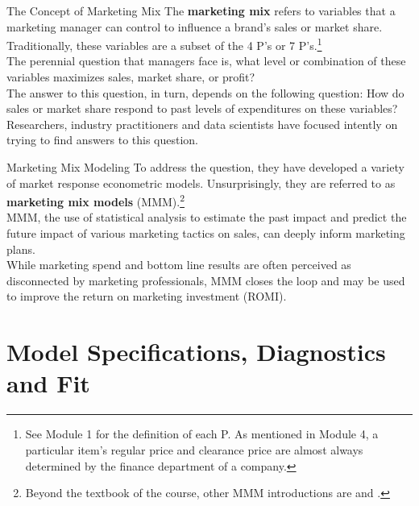 \documentclass[pdf]{beamer}
\newcommand{\empr}[1]{{\color{franklinblue}\textbf{#1}}}
\theoremstyle{remark}
\theoremstyle{definition}
\begin{document}
\begin{frame}[t]{The Concept of Marketing Mix}
The \empr{marketing mix} refers to variables that a marketing manager can control to influence a brand's sales or market share. Traditionally, these variables are a subset of the 4 P's or 7 P's.\footnote{See Module 1 for the definition of each P.  As mentioned in Module 4, a particular item's regular price and clearance price are almost always determined by the finance department of a company.} \\
\vspace{1.5ex}
The perennial question that managers face is, what level or combination of these variables maximizes sales, market share, or profit? \\
\vspace{1.5ex}
 The answer to this question, in turn, depends on the following question: How do sales or market share respond to past levels of  expenditures on these variables? Researchers, industry practitioners and data scientists have focused intently on trying to find answers to this question. 
\end{frame}

\begin{frame}[t]{Marketing Mix Modeling}
To address the question, they have developed a variety of market response econometric models.  Unsurprisingly, they are referred to as \empr{marketing mix models} (MMM).\footnote{Beyond the textbook of the course, other MMM introductions are \cite{tellis2006} and \cite{solana2014}.} \\
\vspace{1.5ex}
MMM, the use of statistical analysis to estimate the past impact and predict the future impact of various marketing tactics on sales, can deeply inform marketing plans. \\
\vspace{1.5ex}
While marketing spend and bottom line results are often perceived as disconnected by marketing professionals, MMM closes the loop and may be used to improve the return on marketing investment (ROMI).
\end{frame}

\section{Model Specifications, Diagnostics and Fit}
\end{document}
